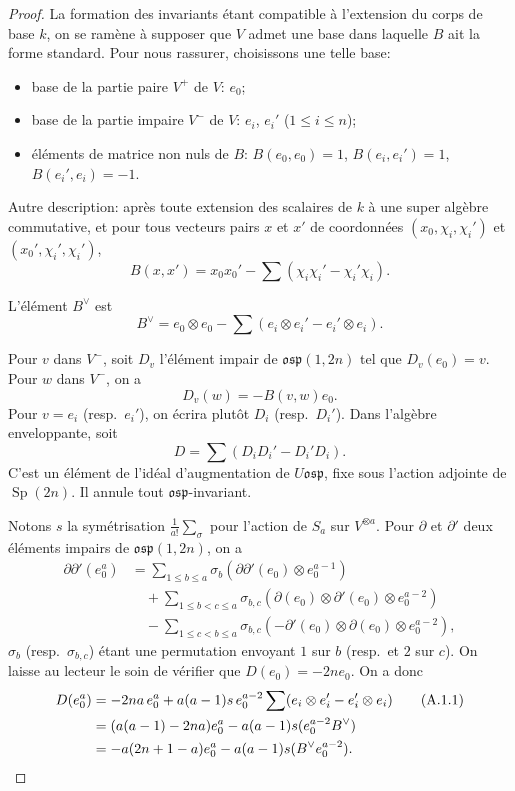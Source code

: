 \documentclass[11pt,a4paper]{article}
\theoremstyle{plain}
\theoremstyle{definition}
\DeclareMathOperator{\Sp}{Sp}
\begin{document}
\begin{proof}
La formation des invariants \'etant compatible \`a l'extension du corps de base $k$, on se ram\`ene \`a supposer que $V$ admet une base dans laquelle $B$ ait la forme standard. Pour nous rassurer, choisissons une telle base:
\begin{itemize}[label={},leftmargin=*]
\item base de la partie paire $V^+$ de $V$: $e_0$;
\item base de la partie impaire $V^-$ de $V$: $e_i$, $e_i'$ ($1 \leq i \leq n$);
\item \'el\'ements de matrice non nuls de $B$: $B(e_0, e_0) = 1$, $B(e_i, e_i') = 1$, $B(e_i', e_i) = -1$.
\end{itemize}

Autre description: apr\`es toute extension des scalaires de $k$ \`a une super alg\`ebre commutative, et pour tous vecteurs pairs $x$ et $x'$ de coordonn\'ees $(x_0, \chi_i, \chi_i')$ et $(x_0', \chi_i', \chi_i')$,
\[
B(x, x') = x_0 x_0' - \sum (\chi_i \chi_i' - \chi_i' \chi_i).
\]

L'\'el\'ement $B^\vee$ est
\[
B^\vee = e_0 \otimes e_0 - \sum (e_i \otimes e_i' - e_i' \otimes e_i).
\]

Pour $v$ dans $V^-$, soit $D_v$ l'\'el\'ement impair de $\mathfrak{osp}(1, 2n)$ tel que $D_v(e_0) = v$. Pour $w$ dans $V^-$, on a
\[
D_v(w) = -B(v, w) e_0.
\]
Pour $v = e_i$ (resp.~$e_i'$), on \'ecrira plut\^ot $D_i$ (resp.~$D_i'$). Dans l'alg\`ebre enveloppante, soit
\[
D = \sum (D_i D_i' - D_i' D_i).
\]
C'est un \'el\'ement de l'id\'eal d'augmentation de $U\mathfrak{osp}$, fixe sous l'action adjointe de $\Sp(2n)$. Il annule tout $\mathfrak{osp}$-invariant.

Notons $s$ la sym\'etrisation $\frac{1}{a!} \sum_\sigma$ pour l'action de $S_a$ sur $V^{\otimes a}$. Pour $\partial$ et $\partial'$ deux \'el\'ements impairs de $\mathfrak{osp}(1, 2n)$, on a
\begin{align*}
\partial \partial' (e_0^a) &= \sum_{1 \leq b \leq a} \sigma_b(\partial \partial' (e_0) \otimes e_0^{a-1}) \\
&\quad + \sum_{1 \leq b < c \leq a} \sigma_{b,c}(\partial(e_0) \otimes \partial'(e_0) \otimes e_0^{a-2}) \\
&\quad - \sum_{1 \leq c < b \leq a} \sigma_{b,c}(-\partial'(e_0) \otimes \partial(e_0) \otimes e_0^{a-2}),
\end{align*}
$\sigma_b$ (resp.~$\sigma_{b,c}$) \'etant une permutation envoyant $1$ sur $b$ (resp.~et $2$ sur $c$). On laisse au lecteur le soin de v\'erifier que $D(e_0) = -2n e_0$. On a donc
\begin{align}
D(e_0^a) &= -2na \, e_0^a + a(a-1) s \, e_0^{a-2} \sum (e_i \otimes e_i' - e_i' \otimes e_i) \tag{A.1.1} \\
&= (a(a-1) - 2na) e_0^a - a(a-1) s(e_0^{a-2} B^\vee) \notag \\
&= -a(2n + 1 - a) e_0^a - a(a-1) s(B^\vee e_0^{a-2}). \notag
\end{align}


\end{proof}
\end{document}
